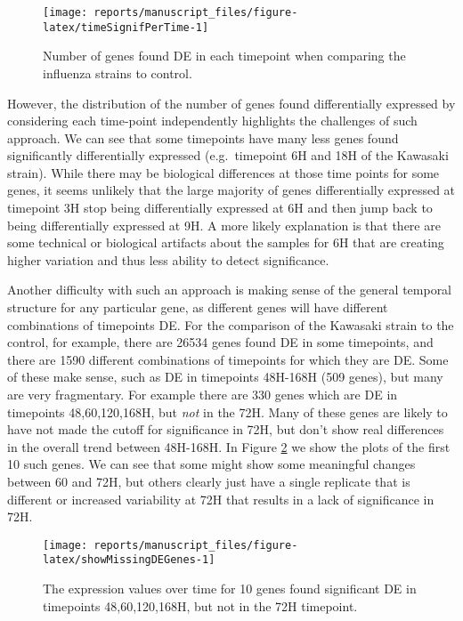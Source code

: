 \documentclass[9pt,a4paper,]{extarticle}
\begin{document}
\begin{figure}[H]

{\centering \texttt{[image: reports/manuscript\_files/figure-latex/timeSignifPerTime-1]} 

}

\caption{Number of genes found DE in each timepoint when comparing the influenza strains to control.}\label{fig:timeSignifPerTime}
\end{figure}

However, the distribution of the number of genes found differentially
expressed by considering each time-point independently highlights the
challenges of such approach. We can see that some timepoints have many less
genes found significantly differentially expressed (e.g.~timepoint 6H and 18H
of the Kawasaki strain). While there may be biological differences at those
time points for some genes, it seems unlikely that the large majority of genes
differentially expressed at timepoint 3H stop being differentially expressed
at 6H and then jump back to being differentially expressed at 9H. A more
likely explanation is that there are some technical or biological artifacts
about the samples for 6H that are creating higher variation and thus less
ability to detect significance.

Another difficulty with such an approach is making sense of the general
temporal structure for any particular gene, as different genes will have
different combinations of timepoints DE. For the comparison of the Kawasaki
strain to the control, for example, there are 26534 genes
found DE in some timepoints, and there are 1590 different
combinations of timepoints for which they are DE. Some of these make sense,
such as DE in timepoints 48H-168H (509 genes), but
many are very fragmentary. For example there are 330
genes which are DE in timepoints 48,60,120,168H, but \emph{not} in the 72H. Many of
these genes are likely to have not made the cutoff for significance in 72H,
but don't show real differences in the overall trend between 48H-168H. In Figure \ref{fig:showMissingDEGenes} we show the plots of the first 10 such genes. We can see that some might
show some meaningful changes between 60 and 72H, but others clearly just have
a single replicate that is different or increased variability at 72H that results in a lack of significance in 72H.

\begin{figure}[H]

{\centering \texttt{[image: reports/manuscript\_files/figure-latex/showMissingDEGenes-1]} 

}

\caption{The expression values over time for 10 genes found significant DE in timepoints 48,60,120,168H, but not in the 72H timepoint.}\label{fig:showMissingDEGenes}
\end{figure}
\end{document}

